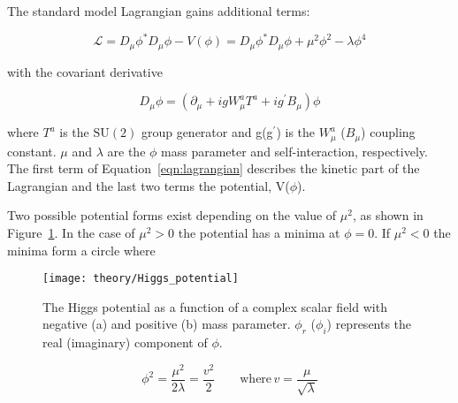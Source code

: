 

The standard model Lagrangian gains additional terms:

\begin{equation}
	\mathcal{L} = D_{\mu}\phi^{*}D_{\mu}\phi - V(\phi) = D_{\mu}\phi^{*}D_{\mu}\phi + \mu^{2}\phi^2 - \lambda \phi^{4}
	\label{eqn:lagrangian}
\end{equation}

with the covariant derivative

\begin{equation}
	D_{\mu} \phi = (\partial_{\mu} + igW_{\mu}^{a}T^{a} + ig^{\prime}B_{\mu})\phi
\end{equation}

where $T^{a}$ is the $\mathrm{SU(2)}$ group generator and g(g$^{\prime}$) is the $W_{\mu}^a$ ($B_{\mu}$) coupling constant. $\mu$ and $\lambda$ are the $\phi$ mass parameter and self-interaction, respectively. The first term of Equation~\ref{eqn:lagrangian} describes the kinetic part of the Lagrangian and the last two terms the potential, V($\phi$).




Two possible potential forms exist depending on the value of $\mu^2$, as shown in Figure~\ref{fig:Higgs_potential}. In the case of $\mu^{2} > 0$ the potential has a minima at $\phi = 0$. If $\mu^{2} < 0$ the minima form a circle where

\begin{figure}[bt]
  \centering
  \texttt{[image: theory/Higgs\_potential]}
  \caption{The Higgs potential as a function of a complex scalar field with negative (a) and positive (b) mass parameter. $\phi_{r}$ ($\phi_{i}$) represents the real (imaginary) component of $\phi$.
  \label{fig:Higgs_potential}}
\end{figure}

\begin{equation}
	\phi^2 = \frac{\mu^{2}}{2 \lambda} = \frac{v^2}{2} \qquad \mathrm{where\,} v = \frac{\mu}{\sqrt{\lambda}}
	\label{eqn:minima}
\end{equation}

